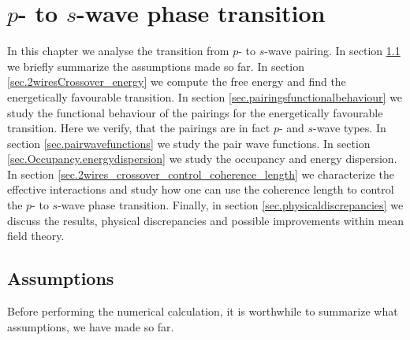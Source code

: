 \chapter{\texorpdfstring{$p$}{p}- to \texorpdfstring{$s$}{s}-wave phase transition} %

\label{Chapter6} 


In this chapter we analyse the transition from $p$- to $s$-wave pairing. In section \ref{sec.assumptions} we briefly summarize the assumptions made so far. In section \ref{sec.2wiresCrossover_energy} we compute the free energy and find the energetically favourable transition. In section \ref{sec.pairingsfunctionalbehaviour} we study the functional behaviour of the pairings for the energetically favourable transition. Here we verify, that the pairings are in fact $p$- and $s$-wave types. In section \ref{sec.pairwavefunctions} we study the pair wave functions. In section \ref{sec.Occupancy.energydispersion} we study the occupancy and energy dispersion. In section \ref{sec.2wires_crossover_control_coherence_length} we characterize the effective interactions and study how one can use the coherence length to control the $p$- to $s$-wave phase transition. Finally, in section \ref{sec.physicaldiscrepancies} we discuss the results, physical discrepancies and possible improvements within mean field theory.

\section{Assumptions} \label{sec.assumptions}
Before performing the numerical calculation, it is worthwhile to summarize what assumptions, we have made so far. 


